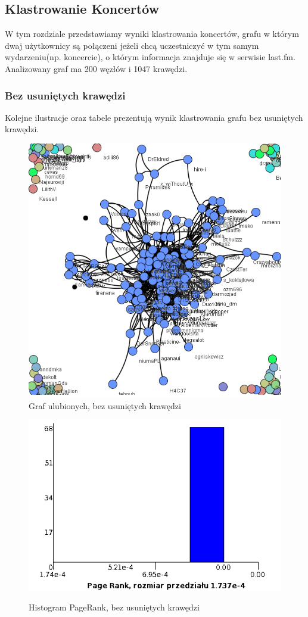 \documentclass[10pt,a4paper]{article}
\begin{document}
\subsection{Klastrowanie Koncertów}
 W tym rozdziale przedstawiamy wyniki klastrowania koncertów, grafu w którym dwaj użytkownicy są połączeni jeżeli chcą uczestniczyć w tym samym wydarzeniu(np. koncercie), o którym informacja znajduje się w serwisie last.fm. Analizowany graf ma 200 węzłów i 1047 krawędzi.

\subsubsection {Bez usuniętych krawędzi}
  Kolejne ilustracje oraz tabele prezentują wynik klastrowania grafu bez usuniętych krawędzi.
\begin{figure}[H]
\centering
\caption{Graf ulubionych, bez usuniętych krawędzi}
\includegraphics[scale=0.5]{wyniki/final200Events/0200events.png}
\end{figure}

\begin{figure}[H]
\centering
\caption{Histogram PageRank, bez usuniętych krawędzi}
\includegraphics[scale=0.6]{wyniki/final200Events/0200eventsPRHist.png}
\label{fig:1200lovedPRHist}
\end{figure}
\end{document}
